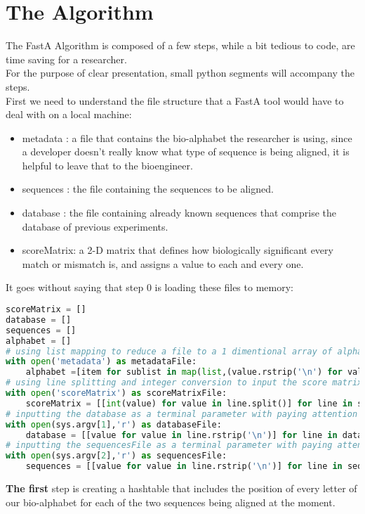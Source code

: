 \documentclass[12pt]{report}
\begin{document}
	\section{\textbf{The Algorithm}}
	The FastA Algorithm is composed of a few steps, while a bit tedious to code, are time saving for a researcher.\\
	For the purpose of clear presentation, small python segments will accompany the steps.\\
	First we need to understand the file structure that a FastA tool would have to deal with on a local machine:\\
	\begin{itemize}
		\item metadata : a file that contains the bio-alphabet the researcher is using, since a developer doesn't really know what type of sequence is being aligned, it is helpful to leave that to the bioengineer.
		\item sequences : the file containing the sequences to be aligned.
		\item database : the file containing already known sequences that comprise the database of previous experiments.
		\item scoreMatrix: a 2-D matrix that defines how biologically significant every match or mismatch is, and assigns a value to each and every one.
	\end{itemize}
	It goes without saying that step 0 is loading these files to memory:
\begin{lstlisting}[language=Python]
scoreMatrix = []
database = []
sequences = []
alphabet = []
# using list mapping to reduce a file to a 1 dimentional array of alphabet
with open('metadata') as metadataFile:
	alphabet =[item for sublist in map(list,(value.rstrip('\n') for value in metadataFile)) for item in sublist]
# using line splitting and integer conversion to input the score matrix
with open('scoreMatrix') as scoreMatrixFile:
	scoreMatrix = [[int(value) for value in line.split()] for line in scoreMatrixFile]
# inputting the database as a terminal parameter with paying attention to new lines
with open(sys.argv[1],'r') as databaseFile:
	database = [[value for value in line.rstrip('\n')] for line in databaseFile]
# inputting the sequencesFile as a terminal parameter with paying attention to new lines
with open(sys.argv[2],'r') as sequencesFile:
	sequences = [[value for value in line.rstrip('\n')] for line in sequencesFile]
\end{lstlisting}
\newpage
\textbf{The first} step is creating a hashtable that includes the position of every letter of our bio-alphabet for each of the two sequences being aligned at the moment.\\
\end{document}
